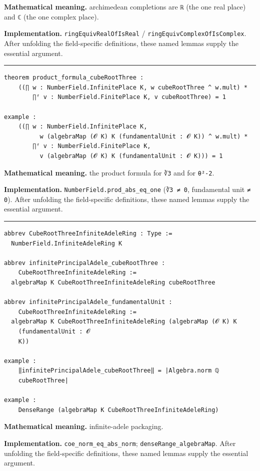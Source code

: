 \documentclass[UTF8,a4paper,11pt,fontset=fandol]{ctexart}
\theoremstyle{definition}
\newcommand{\statementsep}{\par\medskip\hrule\medskip}
\begin{document}
\noindent\textbf{Mathematical meaning.} archimedean completions are \texttt{ℝ} (the one real place) and \texttt{ℂ} (the one complex place).\par
\noindent\textbf{Implementation.} \texttt{ringEquivRealOfIsReal} / \texttt{ringEquivComplexOfIsComplex}. After unfolding the field-specific definitions, these named lemmas supply the essential argument.\par
\statementsep
\begin{verbatim}
theorem product_formula_cubeRootThree :
    ((∏ w : NumberField.InfinitePlace K, w cubeRootThree ^ w.mult) *
        ∏ᶠ v : NumberField.FinitePlace K, v cubeRootThree) = 1

example :
    ((∏ w : NumberField.InfinitePlace K,
          w (algebraMap (𝓞 K) K (fundamentalUnit : 𝓞 K)) ^ w.mult) *
        ∏ᶠ v : NumberField.FinitePlace K,
          v (algebraMap (𝓞 K) K (fundamentalUnit : 𝓞 K))) = 1
\end{verbatim}
\noindent\textbf{Mathematical meaning.} the product formula for \texttt{∛3} and for \texttt{θ²-2}.\par
\noindent\textbf{Implementation.} \texttt{NumberField.\allowbreak{}prod\_\allowbreak{}abs\_\allowbreak{}eq\_\allowbreak{}one} (\texttt{∛3 ≠ 0}, fundamental unit \texttt{≠ 0}). After unfolding the field-specific definitions, these named lemmas supply the essential argument.\par
\statementsep
\begin{verbatim}
abbrev CubeRootThreeInfiniteAdeleRing : Type :=
  NumberField.InfiniteAdeleRing K

abbrev infinitePrincipalAdele_cubeRootThree :
    CubeRootThreeInfiniteAdeleRing :=
  algebraMap K CubeRootThreeInfiniteAdeleRing cubeRootThree

abbrev infinitePrincipalAdele_fundamentalUnit :
    CubeRootThreeInfiniteAdeleRing :=
  algebraMap K CubeRootThreeInfiniteAdeleRing (algebraMap (𝓞 K) K
    (fundamentalUnit : 𝓞
    K))

example :
    ‖infinitePrincipalAdele_cubeRootThree‖ = |Algebra.norm ℚ
    cubeRootThree|

example :
    DenseRange (algebraMap K CubeRootThreeInfiniteAdeleRing)
\end{verbatim}
\noindent\textbf{Mathematical meaning.} infinite-adele packaging.\par
\noindent\textbf{Implementation.} \texttt{coe\_\allowbreak{}norm\_\allowbreak{}eq\_\allowbreak{}abs\_\allowbreak{}norm}; \texttt{denseRange\_\allowbreak{}algebraMap}. After unfolding the field-specific definitions, these named lemmas supply the essential argument.\par
\end{document}
